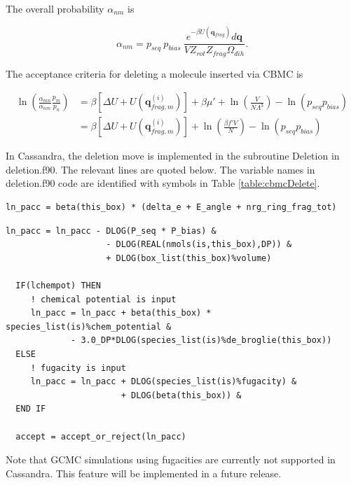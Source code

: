 The overall probability $\alpha_{nm}$ is 

\begin{equation}
\label{eq:alpha_cbmcReverseDelete}
\alpha_{nm} = p_{seq}\ p_{bias}\ \frac{e^{-\beta U(\mathbf{q}_{frag})}d\mathbf{q}}{VZ_{rot}Z_{frag}\Omega_{dih}}.
\end{equation}

The acceptance criteria for deleting a molecule inserted via CBMC is

\begin{align}
\label{eq:pAcc_cbmcDeleteMuShift}
\ln\left( \frac{\alpha_{mn}}{\alpha_{nm}} \frac{p_m}{p_n} \right) &= \beta \left[\Delta U + U(\mathbf{q}^{(i)}_{frag,m})\right] + \beta \mu' + \ln\left( \frac{V}{N\Lambda^3} \right) - \ln\left( p_{seq}p_{bias} \right) \\
\label{eq_pAcc_cbmcDeleteF}
&= \beta \left[\Delta U + U(\mathbf{q}^{(i)}_{frag,m})\right] + \ln\left( \frac{\beta f' V}{N} \right) - \ln\left( p_{seq}p_{bias} \right)
\end{align}

In Cassandra, the deletion move is implemented in the subroutine Deletion in deletion.f90. The relevant lines are quoted below. The variable names in deletion.f90 code are identified with symbols in Table \ref{table:cbmcDelete}.

\begin{minipage}{\linewidth}
\begin{lstlisting}[firstnumber=334, caption=deletion.f90]
  ln_pacc = beta(this_box) * (delta_e + E_angle + nrg_ring_frag_tot)
\end{lstlisting}
\begin{lstlisting}[firstnumber=340]
  ln_pacc = ln_pacc - DLOG(P_seq * P_bias) &
                    - DLOG(REAL(nmols(is,this_box),DP)) &
                    + DLOG(box_list(this_box)%volume)
 
  IF(lchempot) THEN
     ! chemical potential is input
     ln_pacc = ln_pacc + beta(this_box) * species_list(is)%chem_potential &
             - 3.0_DP*DLOG(species_list(is)%de_broglie(this_box))
  ELSE
     ! fugacity is input
     ln_pacc = ln_pacc + DLOG(species_list(is)%fugacity) &
                       + DLOG(beta(this_box)) &
  END IF
 
  accept = accept_or_reject(ln_pacc)

\end{lstlisting}
\end{minipage}

Note that GCMC simulations using fugacities are currently not supported in Cassandra. This feature
will be implemented in a future release.

